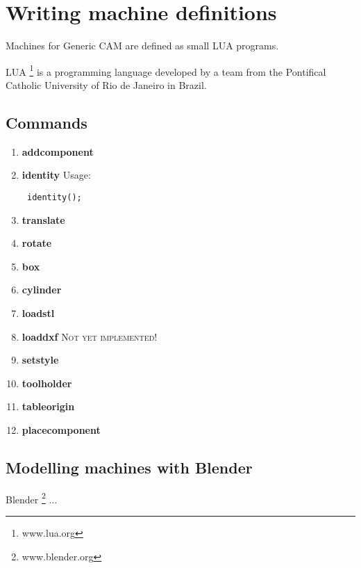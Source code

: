 

\chapter{Writing machine definitions}

Machines for Generic CAM are defined as small LUA programs.

LUA \footnote{www.lua.org} is a programming language developed by a team from the
Pontifical Catholic University of Rio de Janeiro in Brazil.

\section{Commands}

\lstset{language=c}

\begin{enumerate}
\item {\bf addcomponent}

\item {\bf identity}
Usage:
 \begin{lstlisting}
 identity();
 \end{lstlisting}

\item {\bf translate}
\item {\bf rotate}

\item {\bf box}
\item {\bf cylinder}
\item {\bf loadstl}
\item {\bf loaddxf} \textsc{Not yet implemented!}

\item {\bf setstyle}
 
\item {\bf toolholder}
\item {\bf tableorigin}

\item {\bf placecomponent}

\end{enumerate}

\section{Modelling machines with Blender}

Blender \footnote{www.blender.org} ...


